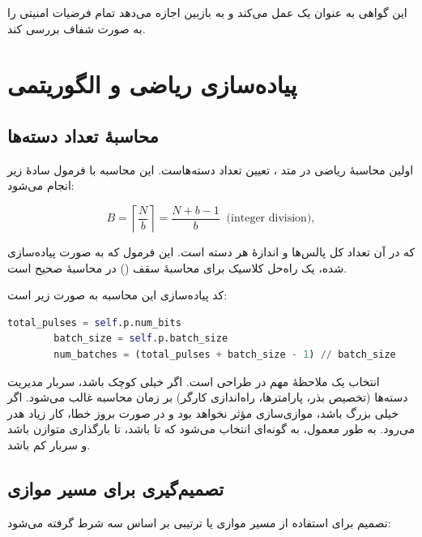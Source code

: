 این گواهی به عنوان یک  عمل می‌کند و به بازبین اجازه می‌دهد تمام فرضیات امنیتی را به صورت شفاف بررسی کند.

\section{پیاده‌سازی ریاضی و الگوریتمی}

\subsection{محاسبۀ تعداد دسته‌ها}

اولین محاسبۀ ریاضی در متد ، تعیین تعداد دسته‌هاست. این محاسبه با فرمول سادۀ زیر انجام می‌شود:

\begin{equation}
	B = \left\lceil \frac{N}{b} \right\rceil = \frac{N + b - 1}{b} \;\;\text{(integer division)},
\end{equation}

\noindent که در آن  تعداد کل پالس‌ها و  اندازۀ هر دسته است. این فرمول که به صورت  پیاده‌سازی شده، یک راه‌حل کلاسیک برای محاسبۀ سقف () در محاسبۀ صحیح است.

کد پیاده‌سازی این محاسبه به صورت زیر است:

\begin{LTR}
	\begin{lstlisting}[language=Python]
		total_pulses = self.p.num_bits
		batch_size = self.p.batch_size
		num_batches = (total_pulses + batch_size - 1) // batch_size
	\end{lstlisting}
\end{LTR}

\noindent انتخاب  یک ملاحظۀ مهم در طراحی است. اگر  خیلی کوچک باشد، سربار مدیریت دسته‌ها (تخصیص بذر،  پارامترها، راه‌اندازی کارگر) بر زمان محاسبه غالب می‌شود. اگر  خیلی بزرگ باشد، موازی‌سازی مؤثر نخواهد بود و در صورت بروز خطا، کار زیاد هدر می‌رود. به طور معمول،  به گونه‌ای انتخاب می‌شود که  تا  باشد، تا بارگذاری متوازن باشد و سربار کم باشد.

\subsection{تصمیم‌گیری برای مسیر موازی}

تصمیم برای استفاده از مسیر موازی یا ترتیبی بر اساس سه شرط گرفته می‌شود:

